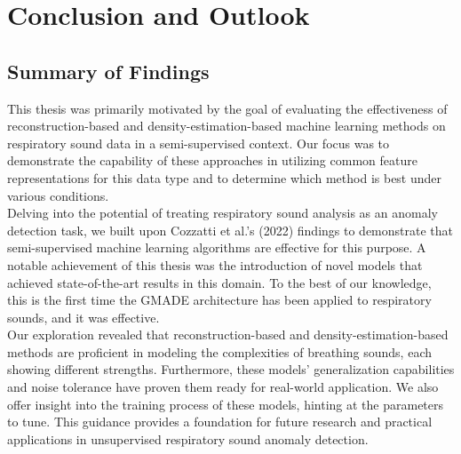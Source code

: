 \cleardoubleoddpage%
\chapter{Conclusion and Outlook}
\section{Summary of Findings}
This thesis was primarily motivated by the goal of evaluating the effectiveness of reconstruction-based and density-estimation-based machine learning methods on respiratory sound data in a semi-supervised context. Our focus was to demonstrate the capability of these approaches in utilizing common feature representations for this data type and to determine which method is best under various conditions.\\
Delving into the potential of treating respiratory sound analysis as an anomaly detection task, we built upon Cozzatti et al.'s (2022) findings to demonstrate that semi-supervised machine learning algorithms are effective for this purpose. A notable achievement of this thesis was the introduction of novel models that achieved state-of-the-art results in this domain. To the best of our knowledge, this is the first time the GMADE architecture has been applied to respiratory sounds, and it was effective.\\
Our exploration revealed that reconstruction-based and density-estimation-based methods are proficient in modeling the complexities of breathing sounds, each showing different strengths. Furthermore, these models' generalization capabilities and noise tolerance have proven them ready for real-world application. We also offer insight into the training process of these models, hinting at the parameters to tune. This guidance provides a foundation for future research and practical applications in unsupervised respiratory sound anomaly detection.
